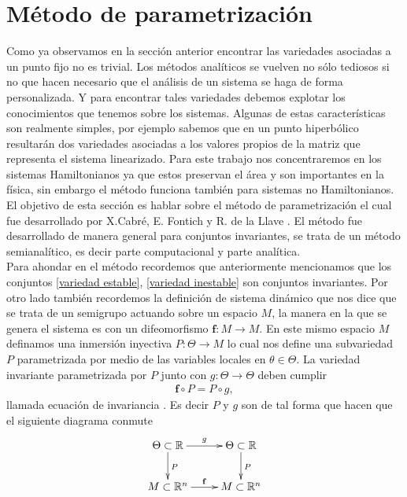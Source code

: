 \section{Método de parametrización}
Como ya observamos en la sección anterior encontrar las variedades asociadas a un punto fijo no es trivial. Los métodos analíticos se vuelven no sólo tediosos si no que hacen necesario que el análisis de un sistema se haga de forma personalizada. Y para encontrar tales variedades debemos explotar los conocimientos que tenemos sobre los sistemas. Algunas de estas características son realmente simples, por ejemplo sabemos que en un punto hiperbólico resultarán dos variedades asociadas a los valores propios de la matriz que representa el sistema linearizado. Para este trabajo nos concentraremos en los sistemas Hamiltonianos ya que estos preservan el área y son importantes en la física, sin embargo el método funciona también para sistemas no Hamiltonianos. El objetivo de esta sección es hablar sobre el método de parametrización el cual fue desarrollado por X.Cabré, E. Fontich y R. de la Llave \cite{Haro}. El método fue desarrollado de manera general para conjuntos invariantes, se trata de un método semianalítico, es decir parte computacional y parte analítica.\\

Para ahondar en el método recordemos que anteriormente mencionamos que los conjuntos \ref{variedad estable}, \ref{variedad inestable} son conjuntos invariantes. Por otro lado también recordemos la definición de sistema dinámico que nos dice que se trata de un semigrupo actuando sobre un espacio $M$, la manera en la que se genera el sistema es con un difeomorfismo $\mathbf{f}:M \rightarrow M$. En este mismo espacio $M$ definamos una inmersión inyectiva $P:\Theta \rightarrow M$  lo cual nos define una subvariedad $P$  parametrizada por medio de las variables locales en $\theta \in \Theta$. La variedad invariante parametrizada por $P$  junto con $g:\Theta \rightarrow \Theta$ deben cumplir 
\begin{eqnarray}
\mathbf{f} \circ P = P \circ g,  \label{Ecua de invariancia}
\end{eqnarray}
llamada ecuación de invariancia \cite{Haro}.
Es decir $P$ y $g$ son de tal forma que hacen que el siguiente diagrama conmute
\begin{eqnarray}
\xymatrix{
\Theta\subset\mathbb{R} \ar[d]^{P} \ar[r]^{g} & \Theta\subset\mathbb{R} \ar[d]^{P} \\
M\subset\mathbb{R}^{n} \ar[r]^{\mathbf{f}} & M\subset\mathbb{R}^{n}
}\label{conmutativo}
\end{eqnarray}

